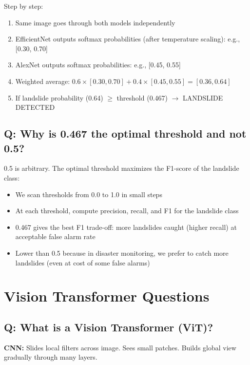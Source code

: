 \documentclass[11pt]{article}
\begin{document}
Step by step:
\begin{enumerate}[noitemsep]
    \item Same image goes through both models independently
    \item EfficientNet outputs softmax probabilities (after temperature scaling): e.g., [0.30, 0.70]
    \item AlexNet outputs softmax probabilities: e.g., [0.45, 0.55]
    \item Weighted average: $0.6 \times [0.30, 0.70] + 0.4 \times [0.45, 0.55] = [0.36, 0.64]$
    \item If landslide probability (0.64) $\geq$ threshold (0.467) $\to$ LANDSLIDE DETECTED
\end{enumerate}

\subsection{Q: Why is 0.467 the optimal threshold and not 0.5?}

0.5 is arbitrary. The optimal threshold maximizes the F1-score of the landslide class:

\begin{itemize}[noitemsep]
    \item We scan thresholds from 0.0 to 1.0 in small steps
    \item At each threshold, compute precision, recall, and F1 for the landslide class
    \item 0.467 gives the best F1 trade-off: more landslides caught (higher recall) at acceptable false alarm rate
    \item Lower than 0.5 because in disaster monitoring, we prefer to catch more landslides (even at cost of some false alarms)
\end{itemize}

\section{Vision Transformer Questions}

\subsection{Q: What is a Vision Transformer (ViT)?}

\textbf{CNN:} Slides local filters across image. Sees small patches. Builds global view gradually through many layers.
\end{document}

